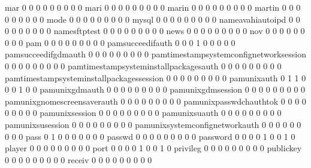 \documentclass[compress,8pt]{beamer}
\begin{document}
\begin{frame}
\begin{Schunk}
  mar                                        0   0   0   0   0   0   0   0   0
  mari                                       0   0   0   0   0   0   0   0   0
  marin                                      0   0   0   0   0   0   0   0   0
  martin                                     0   0   0   0   0   0   0   0   0
  mode                                       0   0   0   0   0   0   0   0   0
  mysql                                      0   0   0   0   0   0   0   0   0
  nameavahiautoipd                           0   0   0   0   0   0   0   0   0
  namesftptest                               0   0   0   0   0   0   0   0   0
  news                                       0   0   0   0   0   0   0   0   0
  nov                                        0   0   0   0   0   0   0   0   0
  pam                                        0   0   0   0   0   0   0   0   0
  pamsucceedifauth                           0   0   0   1   0   0   0   0   0
  pamsucceedifgdmauth                        0   0   0   0   0   0   0   0   0
  pamtimestampsystemconfignetworksession     0   0   0   0   0   0   0   0   0
  pamtimestampsysteminstallpackagesauth      0   0   0   0   0   0   0   0   0
  pamtimestampsysteminstallpackagessession   0   0   0   0   0   0   0   0   0
  pamunixauth                                0   1   1   0   0   0   1   0   0
  pamunixgdmauth                             0   0   0   0   0   0   0   0   0
  pamunixgdmsession                          0   0   0   0   0   0   0   0   0
  pamunixgnomescreensaverauth                0   0   0   0   0   0   0   0   0
  pamunixpasswdchauthtok                     0   0   0   0   0   0   0   0   0
  pamunixsession                             0   0   0   0   0   0   0   0   0
  pamunixsuauth                              0   0   0   0   0   0   0   0   0
  pamunixsusession                           0   0   0   0   0   0   0   0   0
  pamunixsystemconfignetworkauth             0   0   0   0   0   0   0   0   0
  pass                                       0   1   0   0   0   0   0   0   0
  passwd                                     0   0   0   0   0   0   0   0   0
  password                                   0   0   0   0   1   0   0   1   0
  player                                     0   0   0   0   0   0   0   0   0
  port                                       0   0   0   0   1   0   0   1   0
  privileg                                   0   0   0   0   0   0   0   0   0
  publickey                                  0   0   0   0   0   0   0   0   0
  receiv                                     0   0   0   0   0   0   0   0   0

\end{Schunk}
\end{frame}
\end{document}
